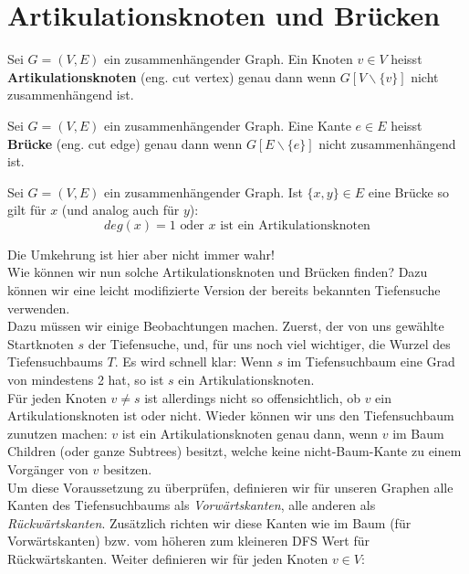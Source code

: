 \chapter{Artikulationsknoten und Brücken}

\begin{definition}
    Sei $G = (V,E)$ ein zusammenhängender Graph. Ein Knoten $v \in V$ heisst \textbf{Artikulationsknoten}
    (eng. cut vertex) genau dann wenn $G[V \backslash \{v\}]$ nicht zusammenhängend ist.
\end{definition}

\begin{definition}
    Sei $G = (V,E)$ ein zusammenhängender Graph. Eine Kante $e \in E$ heisst \textbf{Brücke}
    (eng. cut edge) genau dann wenn $G[E \backslash \{e\}]$ nicht zusammenhängend ist.
\end{definition}

\begin{lemma}
    Sei $G = (V,E)$ ein zusammenhängender Graph. Ist $\{x,y\} \in E$ eine Brücke so gilt für $x$
    (und analog auch für $y$): \\
    $$deg(x) = 1 \text{    oder    } x \text{ ist ein Artikulationsknoten}$$
\end{lemma}
\bigskip

Die Umkehrung ist hier aber nicht immer wahr! \\

Wie können wir nun solche Artikulationsknoten und Brücken finden? Dazu können
wir eine leicht modifizierte Version der bereits bekannten Tiefensuche verwenden. \\

Dazu müssen wir einige Beobachtungen machen. Zuerst, der von uns gewählte Startknoten $s$ der Tiefensuche,
und, für uns noch viel wichtiger, die Wurzel des Tiefensuchbaums $T$. Es wird schnell klar: Wenn $s$ im Tiefensuchbaum
eine Grad von mindestens 2 hat, so ist $s$ ein Artikulationsknoten. \\

Für jeden Knoten $v \neq s$ ist allerdings nicht so offensichtlich, ob $v$ ein Artikulationsknoten ist oder nicht.
Wieder können wir uns den Tiefensuchbaum zunutzen machen: $v$ ist ein Artikulationsknoten genau dann, wenn
$v$ im Baum Children (oder ganze Subtrees) besitzt, welche keine nicht-Baum-Kante zu einem Vorgänger von $v$ besitzen. \\

Um diese Voraussetzung zu überprüfen, definieren wir für unseren Graphen alle Kanten des Tiefensuchbaums als
\textit{Vorwärtskanten}, alle anderen als \textit{Rückwärtskanten}. Zusätzlich richten wir diese Kanten wie im Baum
(für Vorwärtskanten) bzw. vom höheren zum kleineren DFS Wert für Rückwärtskanten. Weiter definieren wir für jeden Knoten
$v \in V$: \\

